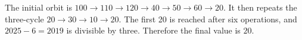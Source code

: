 The initial orbit is $100\to110\to120\to40\to50\to60\to20$. It then repeats the three-cycle $20\to30\to10\to20$. The first 20 is reached after six operations, and $2025-6=2019$ is divisible by three. Therefore the final value is $\boxed{20}$.
